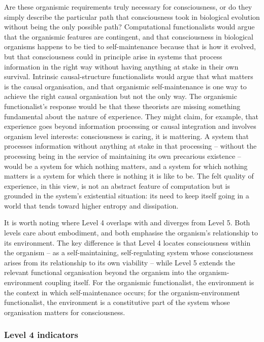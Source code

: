 \documentclass[11pt, a4paper, onecolumn, gdm]{google}
\begin{document}
Are these organismic requirements truly necessary for consciousness, or do they simply describe the particular path that consciousness took in biological evolution without being the only possible path?
Computational functionalists would argue that the organismic features are contingent, and that consciousness in biological organisms happens to be tied to self-maintenance because that is how it evolved, but that consciousness could in principle arise in systems that process information in the right way without having anything at stake in their own survival.
Intrinsic causal-structure functionalists would argue that what matters is the causal organisation, and that organismic self-maintenance is one way to achieve the right causal organisation but not the only way.
The organismic functionalist's response would be that these theorists are missing something fundamental about the nature of experience.
They might claim, for example, that experience goes beyond information processing or causal integration and involves organism level interests: consciousness is caring, it is mattering.
A system that processes information without anything at stake in that processing -- without the processing being in the service of maintaining its own precarious existence -- would be a system for which nothing matters, and a system for which nothing matters is a system for which there is nothing it is like to be.
The felt quality of experience, in this view, is not an abstract feature of computation but is grounded in the system's existential situation: its need to keep itself going in a world that tends toward higher entropy and dissipation.

It is worth noting where Level 4 overlaps with and diverges from Level 5.
Both levels care about embodiment, and both emphasise the organism's relationship to its environment.
The key difference is that Level 4 locates consciousness within the organism -- as a self-maintaining, self-regulating system whose consciousness arises from its relationship to its own viability -- while Level 5 extends the relevant functional organisation beyond the organism into the organism-environment coupling itself.
For the organismic functionalist, the environment is the context in which self-maintenance occurs; for the organism-environment functionalist, the environment is a constitutive part of the system whose organisation matters for consciousness.

\subsubsection*{Level 4 indicators}\label{level-4-indicators}
\end{document}
